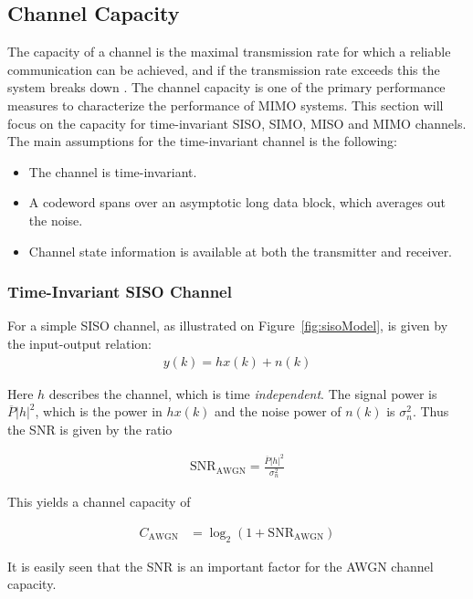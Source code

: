 \subsection{Channel Capacity}
\def\snr{\text{SNR}_{\text{AWGN}}}
\def\PP{\overline{P}}
\def\CC{C_{\text{AWGN}}}

The capacity of a channel is the maximal transmission rate for which a reliable communication can be achieved, and if the transmission rate exceeds this the system breaks down \cite{Tim2012Practical}. The channel capacity is one of the primary performance measures to characterize the performance of MIMO systems\cite{Tim2012Practical}. This section will focus on the capacity for time-invariant SISO, SIMO, MISO and MIMO channels. The main assumptions for the time-invariant channel is the following\cite{Tim2012Practical}: 
\begin{itemize}
\item The channel is time-invariant.
\item A codeword spans over an asymptotic long data block, which averages out the noise.
\item Channel state information is available at both the transmitter and receiver. 
\end{itemize}

\subsubsection{Time-Invariant SISO Channel}
For a simple SISO channel, as illustrated on Figure~\ref{fig:sisoModel}, is given by the input-output relation:
\begin{align*}
  y(k) = h x(k) + n(k)
\end{align*}

Here $h$ describes the channel, which is time \emph{independent}. The signal power is $\PP |h|^2$, which is the power in $h x(k)$ and the noise power of $n(k)$ is $\sigma_n^2$. Thus the SNR is given by the ratio\cite{Tim2012Practical}

\begin{align*}
  \snr = \frac{\PP |h|^2}{\sigma_n^2}
\end{align*}

This yields a channel capacity of 

\begin{align*}
      \CC &= \log_2 \left( 1 + \snr \right)
\end{align*}

It is easily seen that the SNR is an important factor for the AWGN channel capacity.

